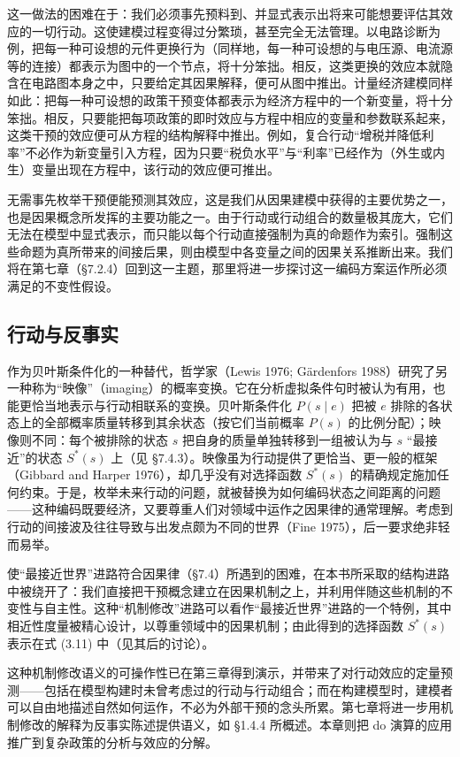这一做法的困难在于：我们必须事先预料到、并显式表示出将来可能想要评估其效应的一切行动。这使建模过程变得过分繁琐，甚至完全无法管理。以电路诊断为例，把每一种可设想的元件更换行为（同样地，每一种可设想的与电压源、电流源等的连接）都表示为图中的一个节点，将十分笨拙。相反，这类更换的效应本就隐含在电路图本身之中，只要给定其因果解释，便可从图中推出。计量经济建模同样如此：把每一种可设想的政策干预变体都表示为经济方程中的一个新变量，将十分笨拙。相反，只要能把每项政策的即时效应与方程中相应的变量和参数联系起来，这类干预的效应便可从方程的结构解释中推出。例如，复合行动“增税并降低利率”不必作为新变量引入方程，因为只要“税负水平”与“利率”已经作为（外生或内生）变量出现在方程中，该行动的效应便可推出。

无需事先枚举干预便能预测其效应，这是我们从因果建模中获得的主要优势之一，也是因果概念所发挥的主要功能之一。由于行动或行动组合的数量极其庞大，它们无法在模型中显式表示，而只能以每个行动直接强制为真的命题作为索引。强制这些命题为真所带来的间接后果，则由模型中各变量之间的因果关系推断出来。我们将在第七章（\S 7.2.4）回到这一主题，那里将进一步探讨这一编码方案运作所必须满足的不变性假设。

\subsection{行动与反事实}

作为贝叶斯条件化的一种替代，哲学家（Lewis 1976; G\"ardenfors 1988）研究了另一种称为“映像”（imaging）的概率变换。它在分析虚拟条件句时被认为有用，也能更恰当地表示与行动相联系的变换。贝叶斯条件化 $P(s\mid e)$ 把被 $e$ 排除的各状态上的全部概率质量转移到其余状态（按它们当前概率 $P(s)$ 的比例分配）；映像则不同：每个被排除的状态 $s$ 把自身的质量单独转移到一组被认为与 $s$ “最接近”的状态 $S^*(s)$ 上（见 \S 7.4.3）。映像虽为行动提供了更恰当、更一般的框架（Gibbard and Harper 1976），却几乎没有对选择函数 $S^*(s)$ 的精确规定施加任何约束。于是，枚举未来行动的问题，就被替换为如何编码状态之间距离的问题——这种编码既要经济，又要尊重人们对领域中运作之因果律的通常理解。考虑到行动的间接波及往往导致与出发点颇为不同的世界（Fine 1975），后一要求绝非轻而易举。

使“最接近世界”进路符合因果律（\S 7.4）所遇到的困难，在本书所采取的结构进路中被绕开了：我们直接把干预概念建立在因果机制之上，并利用伴随这些机制的不变性与自主性。这种“机制修改”进路可以看作“最接近世界”进路的一个特例，其中相近性度量被精心设计，以尊重领域中的因果机制；由此得到的选择函数 $S^*(s)$ 表示在式 \textup{(3.11)} 中（见其后的讨论）。

这种机制修改语义的可操作性已在第三章得到演示，并带来了对行动效应的定量预测——包括在模型构建时未曾考虑过的行动与行动组合；而在构建模型时，建模者可以自由地描述自然如何运作，不必为外部干预的念头所累。第七章将进一步用机制修改的解释为反事实陈述提供语义，如 \S 1.4.4 所概述。本章则把 do 演算的应用推广到复杂政策的分析与效应的分解。

